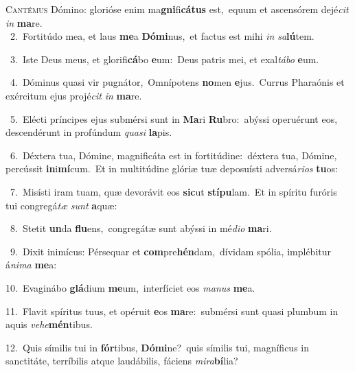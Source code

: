 \lettrine{\initial\textcolor{\initialcolor}{C}}{antémus} Dómino: glorióse enim ma\-\textbf{gni}\-fi\-\textbf{cá}\-\textbf{tus} est,~\star equum et ascensórem dejé\textit{cit} \textit{in} \textbf{ma}\-re.\\
{\numbfont\textcolor{\numbcolor}{~2.}}~Fortitúdo mea, et laus \textbf{me}\-a \textbf{Dó}\-\textbf{mi}nus,~\star et factus est mihi \textit{in} \textit{sa}\-\textbf{lú}tem.\par
{\numbfont\textcolor{\numbcolor}{~3.}}~Iste Deus meus, et glorifi\-\textbf{cá}\-bo \textbf{e}\-um:~\star Deus patris mei, et exal\-\textit{tá}\-\textit{bo} \textbf{e}\-um.\par
{\numbfont\textcolor{\numbcolor}{~4.}}~Dóminus quasi vir pugnátor,~\dagger Omnípotens \textbf{no}\-men \textbf{e}\-jus.~\star Currus Pharaónis et exércitum ejus projé\textit{cit} \textit{in} \textbf{ma}\-re.\par
{\numbfont\textcolor{\numbcolor}{~5.}}~Elécti príncipes ejus submérsi sunt in \textbf{Ma}\-ri \textbf{Ru}\-bro:~\star abýssi operuérunt eos, descendérunt in profúndum \textit{qua}\-\textit{si} \textbf{la}\-pis.\par
{\numbfont\textcolor{\numbcolor}{~6.}}~Déxtera tua, Dómine, magnificáta est in fortitúdine:~\dagger déxtera tua, Dómine, percússit \textbf{in}\-i\-\textbf{mí}\-cum.~\star Et in multitúdine glóriæ tuæ deposuísti adversá\-\textit{ri}\-\textit{os} \textbf{tu}\-os:\par
{\numbfont\textcolor{\numbcolor}{~7.}}~Misísti iram tuam, quæ devorávit eos \textbf{sic}\-ut \textbf{stí}\-\textbf{pu}lam.~\star Et in spíritu furóris tui congregá\textit{tæ} \textit{sunt} \textbf{a}\-quæ:\par
{\numbfont\textcolor{\numbcolor}{~8.}}~Stetit \textbf{un}\-da \textbf{flu}\-ens,~\star congregátæ sunt abýssi in mé\-\textit{di}\-\textit{o} \textbf{ma}\-ri.\par
{\numbfont\textcolor{\numbcolor}{~9.}}~Dixit inimícus: Pérsequar et \textbf{com}\-pre\-\textbf{hén}\-dam,~\star dívidam spólia, implébitur á\-\textit{ni}\-\textit{ma} \textbf{me}\-a:\par
{\numbfont\textcolor{\numbcolor}{10.}}~Evaginábo \textbf{glá}\-dium \textbf{me}\-um,~\star interfíciet eos \textit{ma}\-\textit{nus} \textbf{me}\-a.\par
{\numbfont\textcolor{\numbcolor}{11.}}~Flavit spíritus tuus, et opéruit \textbf{e}\-os \textbf{ma}\-re:~\star submérsi sunt quasi plumbum in aquis \textit{ve}\-\textit{he}\textbf{mén}tibus.\par
{\numbfont\textcolor{\numbcolor}{12.}}~Quis símilis tui in \textbf{fór}\-tibus, \textbf{Dó}\-\textbf{mi}ne?~\star quis símilis tui, magníficus in sanctitáte, terríbilis atque laudábilis, fáciens \textit{mi}\-\textit{ra}\textbf{bí}lia?\par
